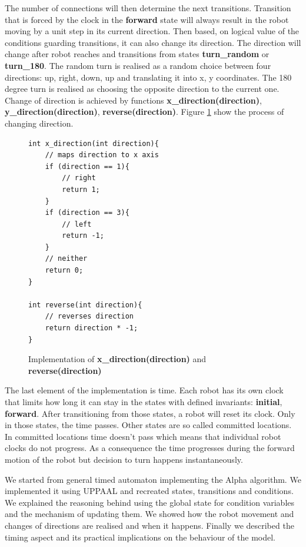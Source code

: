 The number of connections will then determine the next transitions. Transition that is forced by the clock in the \textbf{forward} state will always result in the robot moving by a unit step in its current direction. Then based, on logical value of the conditions guarding transitions, it can also change its direction. The direction will change after robot reaches and transitions from states \textbf{turn\_random} or \textbf{turn\_180}. The random turn is realised as a random choice between four directions: up, right, down, up and translating it into x, y coordinates. The 180 degree turn is realised as choosing the opposite direction to the current one. Change of direction is achieved by functions \textbf{x\_direction(direction)}, \textbf{y\_direction(direction)}, \textbf{reverse(direction)}. Figure \ref{fig:direction} show the process of changing direction.
\begin{figure}[H]
\caption{Implementation of \textbf{x\_direction(direction)} and \textbf{reverse(direction)}}
\lstset { language=C++ }
\begin{lstlisting}
int x_direction(int direction){
    // maps direction to x axis
    if (direction == 1){
        // right
        return 1;
    }
    if (direction == 3){
        // left
        return -1;
    }
    // neither
    return 0;
}

int reverse(int direction){
    // reverses direction
    return direction * -1;
}
\end{lstlisting}
\label{fig:direction}
\end{figure}

The last element of the implementation is time. Each robot has its own clock that limits how long it can stay in the states with defined invariants: \textbf{initial}, \textbf{forward}. After transitioning from those states, a robot will reset its clock. Only in those states, the time passes. Other states are so called committed locations. In committed locations time doesn't pass which means that individual robot clocks do not progress. As a consequence the time progresses during the forward motion of the robot but decision to turn happens instantaneously.

We started from general timed automaton implementing the Alpha algorithm. We implemented it using UPPAAL and recreated states, transitions and conditions. We explained the reasoning behind using the global state for condition variables and the mechanism of updating them. We showed how the robot movement and changes of directions are realised and when it happens. Finally we described the timing aspect and its practical implications on the behaviour of the model.